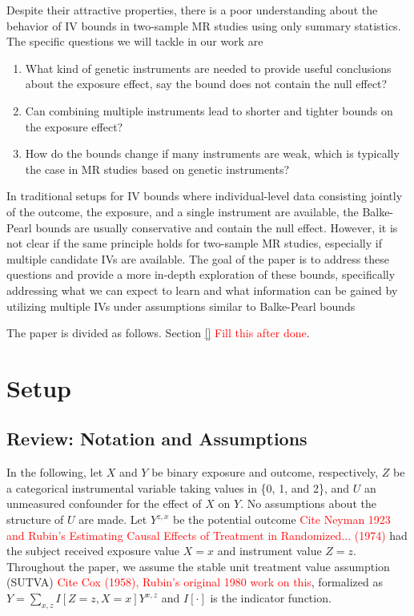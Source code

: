 \documentclass[
]{article}
\theoremstyle{plain}
\begin{document}
Despite their attractive properties, there is a poor understanding about the behavior of IV bounds in two-sample MR studies using only summary statistics. The specific questions we will tackle in our work are
\begin{enumerate}
\item What kind of genetic instruments are needed to provide useful conclusions about the exposure effect, say the bound does not contain the null effect?
\item Can combining multiple instruments lead to shorter and tighter bounds on the exposure effect? 
\item How do the bounds change if many instruments are weak, which is typically the case in MR studies based on genetic instruments? 
\end{enumerate}
In traditional setups for IV bounds where individual-level data consisting jointly of the outcome, the exposure, and a single instrument are available, the Balke-Pearl bounds are usually conservative and contain the null effect. However, it is not clear if the same principle holds for two-sample MR studies, especially if multiple candidate IVs are available. The goal of the paper is to address these questions and provide a more in-depth exploration of these bounds, specifically addressing what we can expect to learn and what information can be gained by utilizing multiple IVs under assumptions similar to Balke-Pearl bounds

The paper is divided as follows. Section \ref{} \textcolor{red}{Fill this after done}.



\hypertarget{setup}{%
\section{Setup}\label{setup}}

\hypertarget{notation-and-definitions}{%
\subsection{Review: Notation and Assumptions}\label{notation-and-definitions}}

In the following, let \(X\) and \(Y\) be binary exposure and outcome, respectively, \(Z\) be a categorical instrumental variable taking values in \{0, 1, and 2\}, and \(U\) an unmeasured confounder for the effect of \(X\) on \(Y\). No assumptions about the structure of \(U\) are made. Let \(Y^{z,x}\) be the potential outcome \textcolor{red}{Cite Neyman 1923 and Rubin's Estimating Causal Effects of Treatment in Randomized... (1974)} had the subject received exposure value \(X = x\) and instrument value \(Z = z\). Throughout the paper, we assume the stable unit treatment value assumption (SUTVA) \textcolor{red}{Cite Cox (1958), Rubin's original 1980 work on this}, formalized as $Y = \sum_{x,z} I[Z = z, X = x] Y^{x,z}$ and $I[\cdot]$ is the indicator function.
\end{document}
